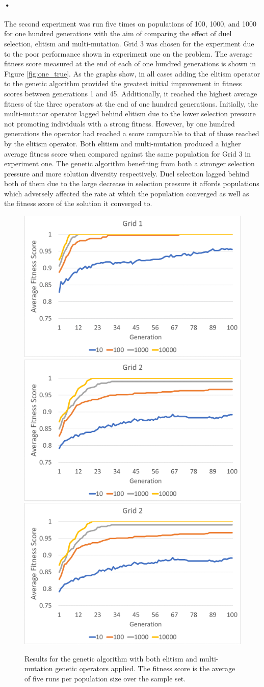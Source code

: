 \documentclass[10pt]{article}
\begin{document}
\paragraph{•}
The second experiment was run five times on populations of 100, 1000, and 1000 for one hundred generations with the aim of comparing the effect of duel selection, elitism and multi-mutation. Grid 3 was chosen for the experiment due to the poor performance shown in experiment one on the problem. The average fitness score measured at the end of each of one hundred generations is shown in Figure \ref{fig:one_true}. As the graphs show, in all cases adding the elitism operator to the genetic algorithm provided the greatest initial improvement in fitness scores between generations 1 and 45. Additionally, it reached the highest average fitness of the three operators at the end of one hundred generations. Initially, the multi-mutator operator lagged behind elitism due to the lower selection pressure not promoting individuals with a strong fitness. However, by one hundred generations the operator had reached a score comparable to that of those reached by the elitism operator. Both elitism and multi-mutation produced a higher average fitness score when compared against the same population for Grid 3 in experiment one. The genetic algorithm benefiting from both a stronger selection pressure and more solution diversity respectively. Duel selection lagged behind both of them due to the large decrease in selection pressure it affords populations which adversely affected the rate at which the population converged as well as the fitness score of the solution it converged to.


\begin{figure}[htp]

\centering
\includegraphics[width=.329\linewidth]{i/e_m_g1.png}\hfill
\includegraphics[width=.329\linewidth]{i/e_m_g2.png}\hfill
\includegraphics[width=.329\linewidth]{i/e_m_g3.png}

\caption{Results for the genetic algorithm with both elitism and multi-mutation genetic operators applied. The fitness score is the average of five runs per population size over the sample set.}
\label{fig:two_true}
\end{figure}
\end{document}
